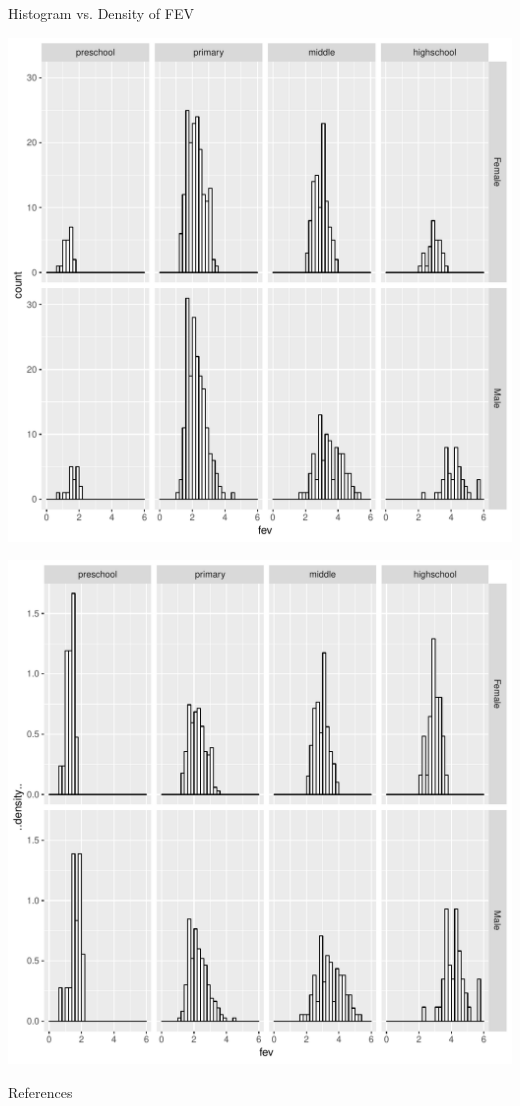 \documentclass[10pt]{beamer}\usepackage[]{graphicx}\usepackage[]{color}
\makeatletter
\def\maxwidth{ %
  \ifdim\Gin@nat@width>\linewidth
    \linewidth
  \else
    \Gin@nat@width
  \fi
}
\newenvironment{knitrout}{}{} %
\makeatother
\begin{document}
\begin{frame}[fragile]{Histogram vs. Density of FEV}

\begin{knitrout}
\color{fgcolor}

{\centering \includegraphics[width=\maxwidth,height=.4\linewidth]{figure/unnamed-chunk-11-1} 

}



\end{knitrout}

\begin{knitrout}
\color{fgcolor}

{\centering \includegraphics[width=\maxwidth,height=.4\linewidth]{figure/unnamed-chunk-12-1} 

}



\end{knitrout}


\end{frame}


\begin{frame}{References}
\small

\end{frame}
\end{document}
